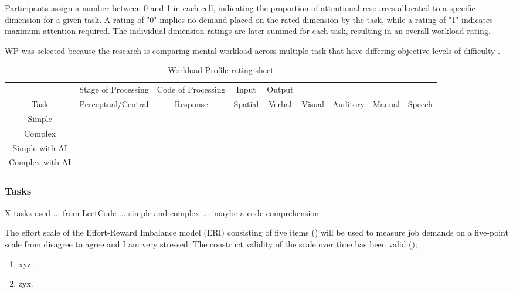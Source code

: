 \documentclass[man]{apa7}
\begin{document}
Participants assign a number between 0 and 1 in each cell, indicating the proportion of attentional resources allocated to a specific dimension for a given task. A rating of "0" implies no demand placed on the rated dimension by the task, while a rating of "1" indicates maximum attention required. The individual dimension ratings are later summed for each task, resulting in an overall workload rating.

WP was selected because the research is comparing mental workload across multiple task that have differing objective levels of difficulty \parencite{Rubio2004EvaluationMethods}.

\begin{table}
    \centering
    \begin{tabular}{ccccccccc}
         & Stage of Processing  & Code of Processing  & Input  & Output & \\
         Task & Perceptual/Central & Response  & Spatial & Verbal & Visual & Auditory & Manual & Speech\\
         Simple &  &  &  &  &  &  &  & \\
         Complex &  &  &  &  &  &  &  & \\
         Simple with AI &  &  &  &  &  &  &  & \\
         Complex with AI &  &  &  &  &  &  &  & \\
    \end{tabular}
    \caption{  Workload  Profile  rating  sheet}
    \label{tab:my_label}
\end{table}

\subsubsection{Tasks}
X tasks used ... from LeetCode ... simple and complex .... maybe a code comprehension 

The effort scale of the Effort-Reward Imbalance model (ERI) consisting of five items (\cite{Siegrist2004TheComparisons}) will be used to measure job demands on a five-point scale from disagree to agree and I am very stressed. The construct validity of the scale over time has been valid (\cite{Rantanen2013FactorialStudies});

\begin{enumerate}
    \item xyz.
    \item zyx.

\end{enumerate}
\end{document}
